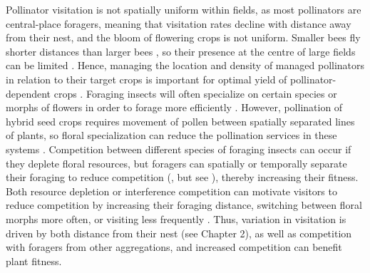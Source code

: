 \documentclass[12pt]{article} %
\begin{document}
Pollinator visitation is not spatially uniform within fields, as most pollinators are central-place foragers, meaning that visitation rates decline with distance away from their nest, and the bloom of flowering crops is not uniform. %
Smaller bees fly shorter distances than larger bees \citep{greenleaf2007,zurbuchen2010}, so their presence at the centre of large fields can be limited \citep{isaacs2010}. 
Hence, managing the location and density of managed pollinators in relation to their target crops is important for optimal yield of pollinator-dependent crops \citep{fries1983,cresswell2004b}.
Foraging insects will often specialize on certain species or morphs of flowers in order to forage more efficiently \citep{heinrich1976b, goulson1997}. 
However, pollination of hybrid seed crops requires movement of pollen between spatially separated lines of plants, so floral specialization can reduce the pollination services in these systems \citep{waytesMsc, gaffney2019}.
Competition between different species of foraging insects can occur if they deplete floral resources, but foragers can spatially or temporally separate their foraging to reduce competition (\citealp{schaffer1979,thomson1987}, but see \citealp{steffan2000}), thereby increasing their fitness. 
Both resource depletion or interference competition can motivate visitors to reduce competition by increasing their foraging distance, switching between floral morphs more often, or visiting less frequently \citep{heinrich1979, greenleaf2006}.
Thus, variation in visitation is driven by both distance from their nest (see Chapter 2), as well as competition with foragers from other aggregations, and increased competition can benefit plant fitness.
\end{document}
